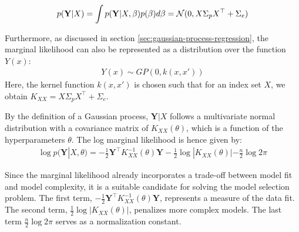 \begin{gather}\label{eq:marginal-likelihood2}
    p(\mathbf{Y}|X) = \int p(\mathbf{Y}|X,\beta) p(\beta) d\beta = \operatorname{\mathcal{N}}(0, X \Sigma_p X^{\top} + \Sigma_e)
\end{gather}

Furthermore, as discussed in section \ref{sec:gaussian-process-regression},
the marginal likelihood can also be represented as a distribution over the function $Y(x)$:
\begin{gather*}
    Y(x) \sim GP(0, k(x, x'))
\end{gather*}
Here, the kernel function $k(x, x')$ is chosen such that for an index set $X$,
we obtain $K_{XX} = X \Sigma_p X^{\top} + \Sigma_e$.

By the definition of a Gaussian process, $\mathbf{Y}|X$ follows a multivariate normal distribution
with a covariance matrix of $K_{XX}(\theta)$, which is a function of the hyperparameters $\theta$.
The log marginal likelihood is hence given by:
\begin{gather}\label{eq:gaussian-marginal-likelihood}
    \log p(\mathbf{Y} | X, \theta) = - \frac{1}{2} \mathbf{Y}^{\top} K_{XX}^{-1}(\theta) \mathbf{Y} -
    \frac{1}{2} \log |K_{XX}(\theta)| - \frac{n}{2} \log 2 \pi
\end{gather}

Since the marginal likelihood already incorporates a trade-off between model fit and
model complexity, it is a suitable candidate for solving the model selection problem.
The first term, $- \frac{1}{2} \mathbf{Y}^{\top} K_{XX}^{-1}(\theta) \mathbf{Y}$,
represents a measure of the data fit. The second term, $\frac{1}{2} \log |K_{XX}(\theta)|$,
penalizes more complex models. The last term $\frac{n}{2} \log 2 \pi$ serves as a normalization constant.















